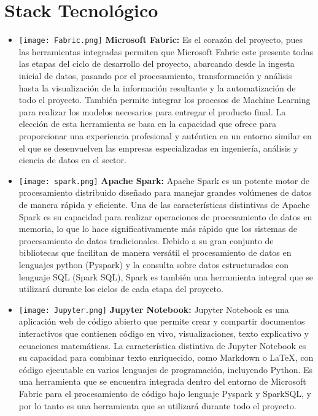 \documentclass[12pt]{article}
\begin{document}
\section{Stack Tecnológico}
\begin{itemize}
    \item \texttt{[image: Fabric.png]}
    \textbf{Microsoft Fabric:} Es el corazón del proyecto, pues las herramientas integradas permiten que Microsoft Fabric este presente todas las etapas del ciclo de desarrollo del proyecto, abarcando desde la ingesta inicial de datos, pasando por el procesamiento, transformación y análisis hasta la visualización de la información resultante y la automatización de todo el proyecto. También permite integrar los procesos de Machine Learning para realizar los modelos necesarios para entregar el producto final.  La elección de esta herramienta se basa en la capacidad que ofrece para proporcionar una experiencia profesional y auténtica en un entorno similar en el que se desenvuelven las empresas especializadas en ingeniería, análisis y ciencia de datos en el sector.

    \item \texttt{[image: spark.png]}
    \textbf{Apache Spark:} Apache Spark es un potente motor de procesamiento distribuido diseñado para manejar grandes volúmenes de datos de manera rápida y eficiente. Una de las características distintivas de Apache Spark es su capacidad para realizar operaciones de procesamiento de datos en memoria, lo que lo hace significativamente más rápido que los sistemas de procesamiento de datos tradicionales. Debido a su gran conjunto de bibliotecas que facilitan de manera versátil el procesamiento de datos en lenguajes python (Pyspark) y la consulta sobre datos estructurados con lenguaje SQL (Spark SQL), Spark es también una herramienta integral que se utilizará durante los ciclos de cada etapa del proyecto.


    \item \texttt{[image: Jupyter.png]}
    \textbf{Jupyter Notebook:} Jupyter Notebook es una aplicación web de código abierto que permite crear y compartir documentos interactivos que contienen código en vivo, visualizaciones, texto explicativo y ecuaciones matemáticas.
    La característica distintiva de Jupyter Notebook es su capacidad para combinar texto enriquecido, como Markdown o LaTeX, con código ejecutable en varios lenguajes de programación, incluyendo Python. Es una herramienta que se encuentra integrada dentro del entorno de Microsoft Fabric para el procesamiento de código bajo lenguaje Pyspark y SparkSQL, y por lo tanto es una herramienta que se utilizará durante todo el proyecto.


\end{itemize}
\end{document}
